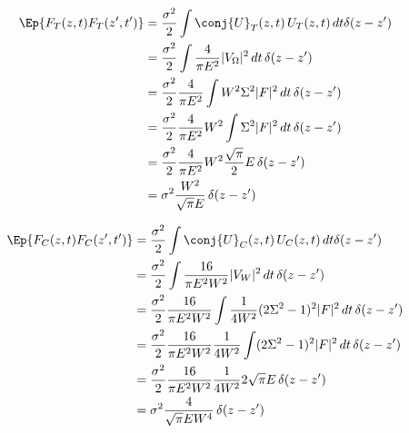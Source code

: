 \begin{equation}
\begin{split}
\Ep{F_T(z,t) F_T(z',t')} &= \frac{\sigma^2}{2} \int \conj{U}_T(z,t)\, U_T(z,t) \,dt \delta(z-z') \\
&= \frac{\sigma^2}{2} \int \frac{4}{\pi E^2} |V_{\Omega}|^2 \,dt \, \delta(z-z')\\
&= \frac{\sigma^2}{2}\frac{4}{\pi E^2}  \int  W^2 \Sigma^2 |F|^2 \,dt \, \delta(z-z')\\
&= \frac{\sigma^2}{2}\frac{4}{\pi E^2} W^2  \int  \Sigma^2 |F|^2 \,dt \, \delta(z-z')\\
&= \frac{\sigma^2}{2}\frac{4}{\pi E^2} W^2  \frac{\sqrt{\pi}}{2}E \, \delta(z-z')\\
&= \sigma^2 \frac{W^2}{\sqrt{\pi} E}   \, \delta(z-z')\\
\end{split}
\end{equation}

\begin{equation}
\begin{split}
\Ep{F_C(z,t) F_C(z',t')} &= \frac{\sigma^2}{2} \int \conj{U}_C(z,t)\, U_C(z,t) \,dt \delta(z-z') \\
&= \frac{\sigma^2}{2} \int \frac{16}{\pi E^2 W^2} |V_W|^2 \,dt \, \delta(z-z')\\
&= \frac{\sigma^2}{2}\frac{16}{ \pi E^2 W^2 }  \int \frac{1}{4 W^2}(2\Sigma^2-1)^2 |F|^2 \,dt \, \delta(z-z')\\
&= \frac{\sigma^2}{2}\frac{16}{ \pi E^2 W^2 } \frac{1}{4 W^2} \int (2\Sigma^2-1)^2 |F|^2 \,dt \, \delta(z-z')\\
&= \frac{\sigma^2}{2}\frac{16}{ \pi E^2 W^2 } \frac{1}{4 W^2} 2\sqrt{\pi} E \, \delta(z-z')\\
&= \sigma^2 \frac{4}{ \sqrt{\pi} E W^4 }   \, \delta(z-z')\\
\end{split}
\end{equation}

